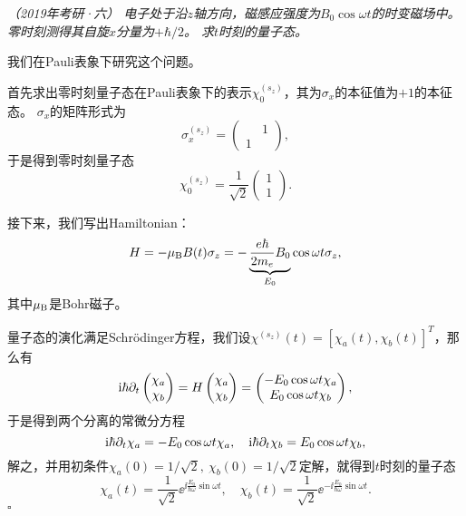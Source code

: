 \begin{tcolorbox}[breakable, title={\textbf{例题}}]
    \it\small
     （2019年考研·六）
    电子处于沿$z$轴方向，磁感应强度为$B_0 \cos\omega t$的时变磁场中。零时刻测得其自旋$x$分量为$+\hbar/2$。
    求$t$时刻的量子态。

    我们在Pauli表象下研究这个问题。

    首先求出零时刻量子态在Pauli表象下的表示$\chi_0^{(s_z)}$，其为$\sigma_x$的本征值为$+1$的本征态。
    $\sigma_x$的矩阵形式为
    \begin{equation}
        \sigma_x^{(s_z)} = \begin{pmatrix} & 1 \\ 1 & \end{pmatrix},
    \end{equation}
    于是得到零时刻量子态
    \begin{equation}
        \chi_0^{(s_z)} = \frac{1}{\sqrt{2}} \begin{pmatrix} 1 \\ 1 \end{pmatrix}.
    \end{equation}

    接下来，我们写出Hamiltonian：
    \begin{equation}
        H = -\mu_{\rm{B}} B(t) \sigma_z = - \underbrace{\frac{e\hbar}{2m_e} B_0}_{E_0} \cos\omega t \sigma_z,
    \end{equation}
    其中$\mu_{\rm{B}}$是Bohr磁子。

    量子态的演化满足Schrödinger方程，我们设$\chi^{(s_z)}(t)=[\chi_a(t), \chi_b(t)]^T$，那么有
    \begin{equation}
        \ii\hbar\pd_t \begin{pmatrix}\chi_a \\ \chi_b \end{pmatrix}
        = H \begin{pmatrix} \chi_a \\ \chi_b \end{pmatrix}
        = \begin{pmatrix} -E_0 \cos\omega t \chi_a \\ E_0 \cos\omega t \chi_b \end{pmatrix},
    \end{equation}
    于是得到两个分离的常微分方程
    \begin{equation}
        \ii\hbar\pd_t \chi_a = -E_0 \cos\omega t \chi_a,\quad
        \ii\hbar\pd_t \chi_b =  E_0 \cos\omega t \chi_b,
    \end{equation}
    解之，并用初条件$\chi_a(0)=1/\sqrt2,\ \chi_b(0)=1/\sqrt2$定解，就得到$t$时刻的量子态
    \begin{equation}
        \chi_a(t) = \frac{1}{\sqrt{2}} \ee^{\ii\frac{E_0}{\hbar\omega}\sin\omega t},\quad
        \chi_b(t) = \frac{1}{\sqrt{2}} \ee^{-\ii\frac{E_0}{\hbar\omega}\sin\omega t}.
    \end{equation}
    \hfill$\square$
\end{tcolorbox}

